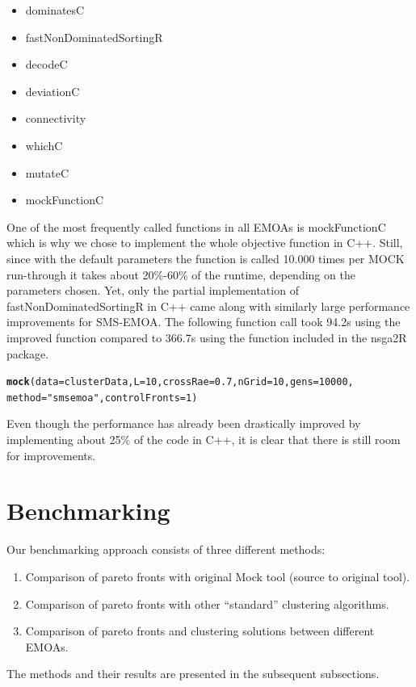 \documentclass[parskip=half,DIV=14]{scrartcl}\usepackage[]{graphicx}\usepackage[]{color}
\makeatletter
\newcommand{\hlnum}[1]{\textcolor[rgb]{0.686,0.059,0.569}{#1}}%
\newcommand{\hlstr}[1]{\textcolor[rgb]{0.192,0.494,0.8}{#1}}%
\newcommand{\hlstd}[1]{\textcolor[rgb]{0.345,0.345,0.345}{#1}}%
\newcommand{\hlkwc}[1]{\textcolor[rgb]{0.333,0.667,0.333}{#1}}%
\newcommand{\hlkwd}[1]{\textcolor[rgb]{0.737,0.353,0.396}{\textbf{#1}}}%
\newenvironment{kframe}{%
 \def\at@end@of@kframe{}%
 \ifinner\ifhmode%
  \def\at@end@of@kframe{\end{minipage}}%
  \begin{minipage}{\columnwidth}%
 \fi\fi%
 \def\FrameCommand##1{\hskip\@totalleftmargin \hskip-\fboxsep
 \colorbox{shadecolor}{##1}\hskip-\fboxsep
     \hskip-\linewidth \hskip-\@totalleftmargin \hskip\columnwidth}%
 \MakeFramed {\advance\hsize-\width
   \@totalleftmargin\z@ \linewidth\hsize
   \@setminipage}}%
 {\par\unskip\endMakeFramed%
 \at@end@of@kframe}
\newenvironment{knitrout}{}{} %
\makeatother
\begin{document}
\begin{itemize}
\item dominatesC
\item fastNonDominatedSortingR
\item decodeC
\item deviationC
\item connectivity
\item whichC
\item mutateC
\item mockFunctionC
\end{itemize}

One of the most frequently called functions in all EMOAs is mockFunctionC which is why we chose to implement the whole objective function in C++. Still, since with the default parameters the function is called 10.000 times per MOCK run-through it takes about 20\%-60\% of the runtime, depending on the parameters chosen. Yet, only the partial implementation of fastNonDominatedSortingR in C++ came along with similarly large performance improvements for SMS-EMOA. The following function call took 94.2s using the improved function compared to 366.7s using the function included in the nsga2R package.
\begin{knitrout}
\color{fgcolor}\begin{kframe}
\begin{alltt}
\hlkwd{mock}\hlstd{(}\hlkwc{data}\hlstd{=clusterData,}\hlkwc{L}\hlstd{=}\hlnum{10}\hlstd{,}\hlkwc{crossRae}\hlstd{=}\hlnum{0.7}\hlstd{,}\hlkwc{nGrid}\hlstd{=}\hlnum{10}\hlstd{,}\hlkwc{gens}\hlstd{=}\hlnum{10000}\hlstd{,}
     \hlkwc{method}\hlstd{=}\hlstr{"smsemoa"}\hlstd{,}\hlkwc{controlFronts}\hlstd{=}\hlnum{1}\hlstd{)}
\end{alltt}
\end{kframe}
\end{knitrout}
Even though the performance has already been drastically improved by implementing about 25\% of the code in C++, it is clear that there is still room for improvements. 



\section{Benchmarking}
Our benchmarking approach consists of three different methods:
\begin{enumerate}
\item Comparison of pareto fronts with original Mock tool (source to original tool).
\item Comparison of pareto fronts with other “standard” clustering algorithms.
\item Comparison of pareto fronts and clustering solutions between different EMOAs.
\end{enumerate}
The methods and their results are presented in the subsequent subsections.
\end{document}
